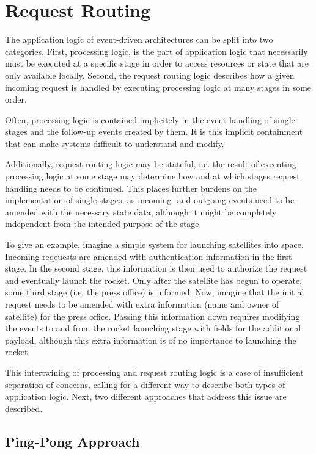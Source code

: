 \documentclass{sig-alternate}
\begin{document}
\section{Request Routing}

The application logic of event-driven architectures can be split into two categories. First,
processing logic, is the part of application logic that necessarily must be executed at a specific
stage in order to access resources or state that are only available locally. Second, the request
routing logic describes how a given incoming request is handled by executing processing logic at
many stages in some order. 

Often, processing logic is contained implicitely in the event handling of single stages and the
follow-up events created by them. It is this implicit containment that can make systems difficult to
understand and modify.

Additionally, request routing logic may be stateful, i.e. the result of executing processing logic
at some stage may determine how and at which stages request handling needs to be continued. This
places further burdens on the implementation of single stages, as incoming- and outgoing events need
to be amended with the necessary state data, although it might be completely independent from the
intended purpose of the stage.

To give an example, imagine a simple system for launching satellites into space. Incoming
reqeuests are amended with authentication information in the first stage. In the second stage, this
information is then used to authorize the request and eventually launch the rocket. Only after the
satellite has begun to operate, some third stage (i.e. the press office) is informed.  Now, imagine
that the initial request needs to be amended with extra information (name and owner of satellite)
for the press office.  Passing this information down requires modifying the events to and from
the rocket launching stage with fields for the additional payload, although this extra information
is of no importance to launching the rocket.

This intertwining of processing and request routing logic is a case of insufficient separation of
concerns, calling for a different way to describe both types of application logic.  Next, two 
different approaches that address this issue are described.


\subsection{Ping-Pong Approach}
\end{document}

